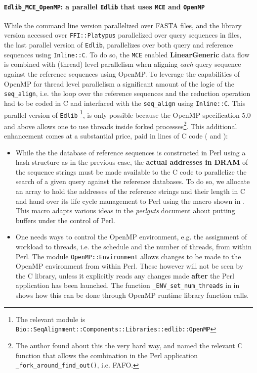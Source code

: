 \documentclass[10pt]{article}
\begin{document}
\paragraph{\texttt{Edlib\_MCE\_OpenMP}: a parallel \texttt{Edlib} that uses \texttt{MCE} and \texttt{OpenMP}}  While the command line version parallelized over FASTA files, and the library version accessed over \texttt{FFI::Platypus} parallelized over query sequences in files, the last parallel version of \texttt{Edlib}, parallelizes over both query and reference sequences using \texttt{Inline::C}. To do so, the \texttt{MCE} enabled \textbf{LinearGeneric} data flow is combined with (thread) level parallelism when aligning \textit{each} query sequence against the reference sequences using OpenMP. To leverage the capabilities of OpenMP for thread level parallelism a significant amount of the logic of the \texttt{seq\_align}, i.e. the loop over the reference sequences and the reduction operation had to be coded in C and interfaced with the \texttt{seq\_align} using \texttt{Inline::C}. This parallel version of \texttt{Edlib} \footnote{The relevant module is \texttt{Bio::SeqAlignment::Components::Libraries::edlib::OpenMP}}, is only possible because the OpenMP specification 5.0 and above allows one to use threads inside forked processes\footnote{The author found about this the very hard way, and named the relevant C function that allows the combination in the Perl application \texttt{\_fork\_around\_find\_out()}, i.e. FAFO.}. This additional enhancement comes at a substantial price, paid in lines of C code ( and ):
\begin{itemize}
\item While the the database of reference sequences is constructed in Perl using a hash structure as in the previous case, the  \textbf{actual addresses in DRAM} of the sequence strings must be made available to the C code to parallelize the search of a given query against the reference databases. To do so, we allocate an array to hold the addresses of the reference strings and their length in C and hand over its life cycle management to Perl using the macro shown in . This macro adapts various ideas in the \textit{perlguts} document about putting buffers under the control of Perl. 
\item One needs ways to control the OpenMP environment, e.g. the assignment of workload to threads, i.e. the schedule and the number of threads, from within Perl. The module \texttt{OpenMP::Environment} allows changes to be made to the OpenMP environment from within Perl. These however will not be seen by the C library, unless it explicitly reads any changes made \textbf{after} the Perl application has been launched. The function \texttt{\_ENV\_set\_num\_threads} in  in  shows how this can be done through OpenMP runtime library function calls. 
\end{itemize}
\end{document}
